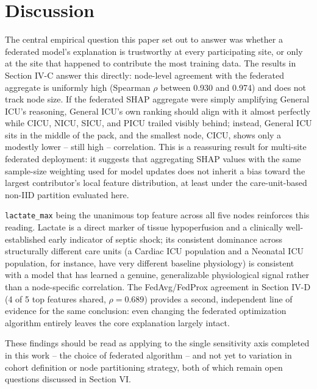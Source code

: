 \documentclass[conference]{IEEEtran}
\begin{document}
\section{Discussion}

The central empirical question this paper set out to answer was whether a
federated model's explanation is trustworthy at every participating site,
or only at the site that happened to contribute the most training data.
The results in Section IV-C answer this directly: node-level agreement with
the federated aggregate is uniformly high (Spearman $\rho$ between 0.930
and 0.974) and does not track node size. If the federated SHAP aggregate
were simply amplifying General ICU's reasoning, General ICU's own ranking
should align with it almost perfectly while CICU, NICU, SICU, and PICU
trailed visibly behind; instead, General ICU sits in the middle of the
pack, and the smallest node, CICU, shows only a modestly lower -- still
high -- correlation. This is a reassuring result for multi-site federated
deployment: it suggests that aggregating SHAP values with the same
sample-size weighting used for model updates does not inherit a bias
toward the largest contributor's local feature distribution, at least
under the care-unit-based non-IID partition evaluated here.

\texttt{lactate\_max} being the unanimous top feature across all five
nodes reinforces this reading. Lactate is a direct marker of tissue
hypoperfusion and a clinically well-established early indicator of septic
shock; its consistent dominance across structurally different care units
(a Cardiac ICU population and a Neonatal ICU population, for instance, have
very different baseline physiology) is consistent with a model that has
learned a genuine, generalizable physiological signal rather than a
node-specific correlation. The FedAvg/FedProx agreement in Section IV-D
(4 of 5 top features shared, $\rho = 0.689$) provides a second, independent
line of evidence for the same conclusion: even changing the federated
optimization algorithm entirely leaves the core explanation largely intact.

These findings should be read as applying to the single sensitivity axis
completed in this work -- the choice of federated algorithm -- and not yet
to variation in cohort definition or node partitioning strategy, both of
which remain open questions discussed in Section VI.
\end{document}
